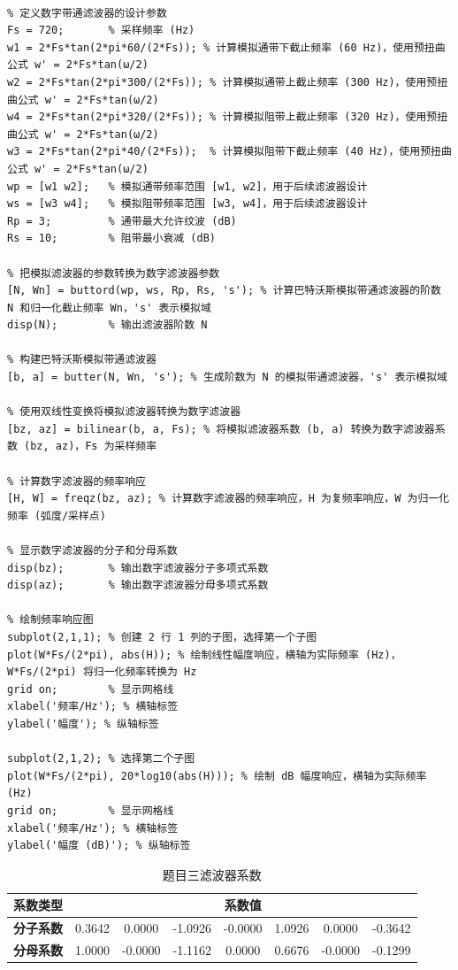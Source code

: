 \documentclass[12pt,hyperref,a4paper,UTF8]{ctexart}
\begin{document}
\begin{lstlisting}[style=matlab, caption={ MATLAB实现代码}]

% 定义数字带通滤波器的设计参数
Fs = 720;       % 采样频率 (Hz)
w1 = 2*Fs*tan(2*pi*60/(2*Fs)); % 计算模拟通带下截止频率 (60 Hz)，使用预扭曲公式 w' = 2*Fs*tan(ω/2)
w2 = 2*Fs*tan(2*pi*300/(2*Fs)); % 计算模拟通带上截止频率 (300 Hz)，使用预扭曲公式 w' = 2*Fs*tan(ω/2)
w4 = 2*Fs*tan(2*pi*320/(2*Fs)); % 计算模拟阻带上截止频率 (320 Hz)，使用预扭曲公式 w' = 2*Fs*tan(ω/2)
w3 = 2*Fs*tan(2*pi*40/(2*Fs));  % 计算模拟阻带下截止频率 (40 Hz)，使用预扭曲公式 w' = 2*Fs*tan(ω/2)
wp = [w1 w2];   % 模拟通带频率范围 [w1, w2]，用于后续滤波器设计
ws = [w3 w4];   % 模拟阻带频率范围 [w3, w4]，用于后续滤波器设计
Rp = 3;         % 通带最大允许纹波 (dB)
Rs = 10;        % 阻带最小衰减 (dB)

% 把模拟滤波器的参数转换为数字滤波器参数
[N, Wn] = buttord(wp, ws, Rp, Rs, 's'); % 计算巴特沃斯模拟带通滤波器的阶数 N 和归一化截止频率 Wn，'s' 表示模拟域
disp(N);        % 输出滤波器阶数 N

% 构建巴特沃斯模拟带通滤波器
[b, a] = butter(N, Wn, 's'); % 生成阶数为 N 的模拟带通滤波器，'s' 表示模拟域

% 使用双线性变换将模拟滤波器转换为数字滤波器
[bz, az] = bilinear(b, a, Fs); % 将模拟滤波器系数 (b, a) 转换为数字滤波器系数 (bz, az)，Fs 为采样频率

% 计算数字滤波器的频率响应
[H, W] = freqz(bz, az); % 计算数字滤波器的频率响应，H 为复频率响应，W 为归一化频率 (弧度/采样点)

% 显示数字滤波器的分子和分母系数
disp(bz);       % 输出数字滤波器分子多项式系数
disp(az);       % 输出数字滤波器分母多项式系数

% 绘制频率响应图
subplot(2,1,1); % 创建 2 行 1 列的子图，选择第一个子图
plot(W*Fs/(2*pi), abs(H)); % 绘制线性幅度响应，横轴为实际频率 (Hz)，W*Fs/(2*pi) 将归一化频率转换为 Hz
grid on;        % 显示网格线
xlabel('频率/Hz'); % 横轴标签
ylabel('幅度'); % 纵轴标签

subplot(2,1,2); % 选择第二个子图
plot(W*Fs/(2*pi), 20*log10(abs(H))); % 绘制 dB 幅度响应，横轴为实际频率 (Hz)
grid on;        % 显示网格线
xlabel('频率/Hz'); % 横轴标签
ylabel('幅度 (dB)'); % 纵轴标签

\end{lstlisting}

\begin{table}[H]
\centering
\caption{题目三滤波器系数}
\label{tab:filter_coef3}
\begin{tabular}{|c|c|c|c|c|c|c|c|}
\hline
\textbf{系数类型} & \multicolumn{7}{c|}{\textbf{系数值}} \\
\hline
\textbf{分子系数} & 0.3642 & 0.0000 & -1.0926 & -0.0000 & 1.0926 & 0.0000 & -0.3642 \\
\hline
\textbf{分母系数} & 1.0000 & -0.0000 & -1.1162 & 0.0000 & 0.6676 & -0.0000 & -0.1299 \\
\hline
\end{tabular}
\end{table}
\end{document}
